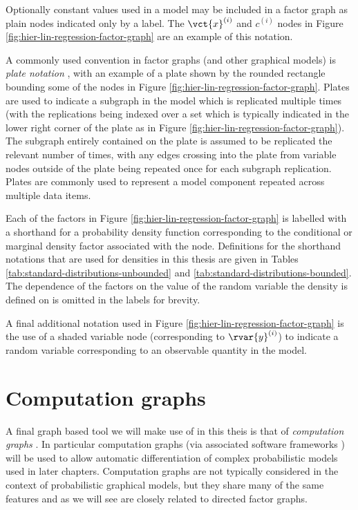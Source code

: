 Optionally constant values used in a model may be included in a factor graph as plain nodes indicated only by a label. The $\vct{x}^{(i)}$ and $c^{(i)}$ nodes in Figure \ref{fig:hier-lin-regression-factor-graph} are an example of this notation.

A commonly used convention in factor graphs (and other graphical models) is \emph{plate notation} \citep{buntine1994operations}, with an example of a plate shown by the rounded rectangle bounding some of the nodes in Figure \ref{fig:hier-lin-regression-factor-graph}. Plates are used to indicate a subgraph in the model which is replicated multiple times (with the replications being indexed over a set which is typically indicated in the lower right corner of the plate as in Figure \ref{fig:hier-lin-regression-factor-graph}). The subgraph entirely contained on the plate is assumed to be replicated the relevant number of times, with any edges crossing into the plate from variable nodes outside of the plate being repeated once for each subgraph replication. Plates are commonly used to represent a model component repeated across multiple data items.

Each of the factors in Figure \ref{fig:hier-lin-regression-factor-graph} is labelled with a shorthand for a probability density function corresponding to the conditional or marginal density factor associated with the node. Definitions for the shorthand notations that are used for densities in this thesis are given in Tables \ref{tab:standard-distributions-unbounded} and \ref{tab:standard-distributions-bounded}. The dependence of the factors on the value of the random variable the density is defined on is omitted in the labels for brevity.

A final additional notation used in Figure \ref{fig:hier-lin-regression-factor-graph} is the use of a shaded variable node (corresponding to $\rvar{y}^{(i)}$) to indicate a random variable corresponding to an observable quantity in the model. %

\section{Computation graphs}\label{sec:computation-graphs}

A final graph based tool we will make use of in this theis is that of \emph{computation graphs} \citep{bauer1974computational}. In particular computation graphs (via associated software frameworks \citep{theano2016theano}) will be used to allow automatic differentiation of complex probabilistic models used in later chapters. Computation graphs are not typically considered in the context of probabilistic graphical models, but they share many of the same features and as we will see are closely related to directed factor graphs.

